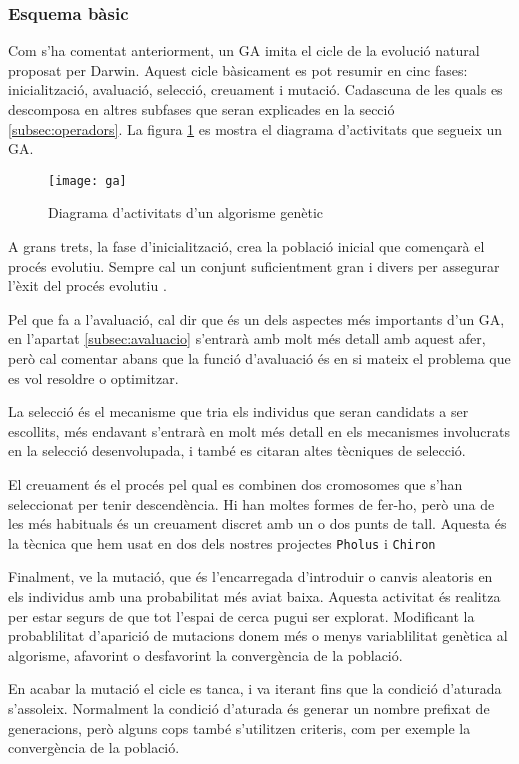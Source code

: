 \documentclass[titlepage,a4paper,12pt]{book}
\begin{document}
\subsubsection{Esquema bàsic}

Com s'ha comentat anteriorment, un GA imita el cicle de la evolució natural
proposat per Darwin. Aquest cicle bàsicament es pot resumir en cinc fases:
inicialització, avaluació, selecció, creuament i mutació. Cadascuna de les quals
es descomposa en altres subfases que seran explicades en la secció
\ref{subsec:operadors}. La figura \ref{fig:ga} es mostra el diagrama
d'activitats que segueix un GA.

\begin{figure} \centering \texttt{[image: ga]}
\caption{\label{fig:ga}Diagrama d'activitats d'un algorisme genètic}
\end{figure}

A grans trets, la fase d'inicialització, crea la població inicial que començarà
el procés evolutiu. Sempre cal un conjunt suficientment gran i divers per
assegurar l'èxit del procés evolutiu \cite{G02}.

Pel que fa a l'avaluació, cal dir que és un dels aspectes més importants d'un
GA, en l'apartat \ref{subsec:avaluacio} s'entrarà amb molt més detall amb aquest
afer, però cal comentar abans que la funció d'avaluació és en si mateix el
problema que es vol resoldre o optimitzar.

La selecció és el mecanisme que tria els individus que seran candidats a ser
escollits, més endavant s'entrarà en molt més detall en els mecanismes
involucrats en la selecció desenvolupada, i també es citaran altes tècniques de
selecció.

El creuament és el procés pel qual es combinen dos cromosomes que s'han
seleccionat per tenir descendència. Hi han moltes formes de fer-ho, però una de
les més habituals és un creuament discret amb un o dos punts de tall.  Aquesta
és la tècnica que hem usat en dos dels nostres projectes \texttt{Pholus} i
\texttt{Chiron}  %

Finalment, ve la mutació, que és l'encarregada d'introduir o canvis aleatoris en
els individus amb una probabilitat més aviat baixa. Aquesta activitat és
realitza per estar segurs de que tot l'espai de cerca pugui ser explorat.
Modificant la probablilitat d'aparició de mutacions donem més o menys
variablilitat genètica al algorisme, afavorint o desfavorint la convergència de
la població.

En acabar la mutació el cicle es tanca, i va iterant fins que la condició
d'aturada s'assoleix. Normalment la condició d'aturada és generar un nombre
prefixat de generacions, però alguns cops també s'utilitzen criteris, com per
exemple la convergència de la població.
\end{document}
